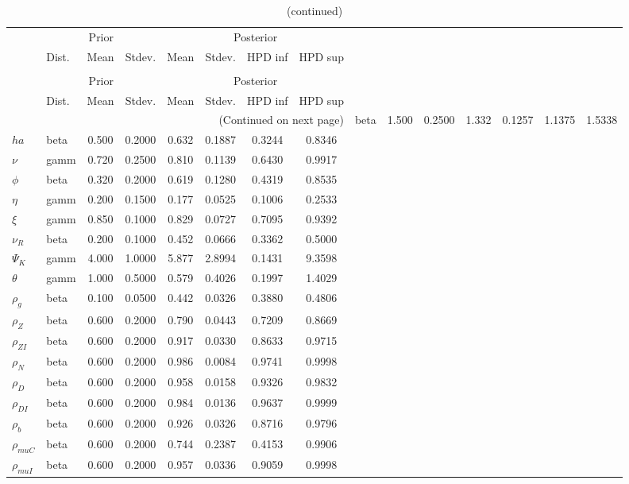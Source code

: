  
\begin{center}
\begin{longtable}{llcccccc} 
\caption{Results from Metropolis-Hastings (parameters)}
 \label{Table:MHPosterior:1}\\
\toprule 
  & \multicolumn{3}{c}{Prior}  &  \multicolumn{4}{c}{Posterior} \\
  \cmidrule(r{.75em}){2-4} \cmidrule(r{.75em}){5-8}
  & Dist. & Mean  & Stdev. & Mean & Stdev. & HPD inf & HPD sup\\
\midrule \endfirsthead 
\caption{(continued)}\\\toprule 
  & \multicolumn{3}{c}{Prior}  &  \multicolumn{4}{c}{Posterior} \\
  \cmidrule(r{.75em}){2-4} \cmidrule(r{.75em}){5-8}
  & Dist. & Mean  & Stdev. & Mean & Stdev. & HPD inf & HPD sup\\
\midrule \endhead 
\bottomrule \multicolumn{8}{r}{(Continued on next page)} \endfoot 
\bottomrule \endlastfoot 
${\sigma}$ & beta &   1.500 & 0.2500 &   1.332& 0.1257 &  1.1375 &  1.5338 \\ 
${ha}$ & beta &   0.500 & 0.2000 &   0.632& 0.1887 &  0.3244 &  0.8346 \\ 
$\nu$ & gamm &   0.720 & 0.2500 &   0.810& 0.1139 &  0.6430 &  0.9917 \\ 
${\phi}$ & beta &   0.320 & 0.2000 &   0.619& 0.1280 &  0.4319 &  0.8535 \\ 
${\eta}$ & gamm &   0.200 & 0.1500 &   0.177& 0.0525 &  0.1006 &  0.2533 \\ 
$\xi$ & gamm &   0.850 & 0.1000 &   0.829& 0.0727 &  0.7095 &  0.9392 \\ 
${\nu_R}$ & beta &   0.200 & 0.1000 &   0.452& 0.0666 &  0.3362 &  0.5000 \\ 
${\Psi_{K}}$ & gamm &   4.000 & 1.0000 &   5.877& 2.8994 &  0.1431 &  9.3598 \\ 
${\theta}$ & gamm &   1.000 & 0.5000 &   0.579& 0.4026 &  0.1997 &  1.4029 \\ 
${\rho_g}$ & beta &   0.100 & 0.0500 &   0.442& 0.0326 &  0.3880 &  0.4806 \\ 
${\rho_Z}$ & beta &   0.600 & 0.2000 &   0.790& 0.0443 &  0.7209 &  0.8669 \\ 
${\rho_{ZI}}$ & beta &   0.600 & 0.2000 &   0.917& 0.0330 &  0.8633 &  0.9715 \\ 
${\rho_N}$ & beta &   0.600 & 0.2000 &   0.986& 0.0084 &  0.9741 &  0.9998 \\ 
${\rho_D}$ & beta &   0.600 & 0.2000 &   0.958& 0.0158 &  0.9326 &  0.9832 \\ 
${\rho_{DI}}$ & beta &   0.600 & 0.2000 &   0.984& 0.0136 &  0.9637 &  0.9999 \\ 
${\rho_b}$ & beta &   0.600 & 0.2000 &   0.926& 0.0326 &  0.8716 &  0.9796 \\ 
${\rho_{muC}}$ & beta &   0.600 & 0.2000 &   0.744& 0.2387 &  0.4153 &  0.9906 \\ 
${\rho_{muI}}$ & beta &   0.600 & 0.2000 &   0.957& 0.0336 &  0.9059 &  0.9998 \\ 
\end{longtable}
 \end{center}

